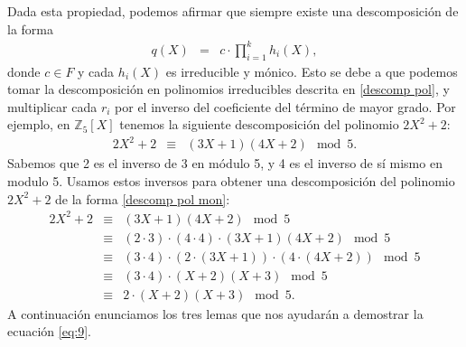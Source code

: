 \documentclass[10pt]{article}
\newcommand{\0}{\mathbf{0}}
\newcommand{\1}{\mathbf{1}}
\newcommand{\modl}{\mod}
\newcommand{\+}{\oplus}
\newcommand{\comentarioin}[1]{}
\theoremstyle{remark}
\theoremstyle{remark}
\begin{document}
Dada esta propiedad,
podemos afirmar que siempre existe una descomposición de la
forma
\begin{eqnarray}
  q(X) & = & c\cdot \prod\limits_{i=1}^k h_i(X), \label{descomp pol mon}
\end{eqnarray}
donde $c\in F$ y cada $h_i(X)$ es irreducible y mónico. Esto se debe a
que podemos tomar la descomposición en polinomios irreducibles
descrita en \eqref{descomp pol}, y multiplicar cada $r_i$ por el
inverso del coeficiente del término de mayor grado. Por ejemplo, en
$\mathbb{Z}_{5}[X]$ tenemos la siguiente descomposición del polinomio
$2X^2 + 2$:
\begin{eqnarray*}
2X^2 + 2 & \equiv & (3X+1)(4X+2) \modl 5.
\end{eqnarray*}
Sabemos que 2 es el inverso de 3 en módulo 5, y 4 es el inverso de sí
mismo en modulo 5. Usamos estos inversos para obtener una
descomposición del polinomio $2X^2 + 2$ de la forma \eqref{descomp pol
  mon}:
\begin{eqnarray*}
  2X^2 + 2 & \equiv & (3X+1)(4X+2) \modl 5\\
  & \equiv & (2\cdot 3) \cdot (4 \cdot 4) \cdot (3X+1)(4X+2) \modl 5\\
  & \equiv & (3 \cdot 4) \cdot (2 \cdot (3X+1))\cdot(4 \cdot (4X+2)) \modl 5\\
  & \equiv & (3 \cdot 4) \cdot (X+2)(X+3) \modl 5\\
    & \equiv & 2\cdot (X+2)(X+3) \modl 5.
\end{eqnarray*}
A continuación enunciamos los tres lemas que nos ayudarán a demostrar
la ecuación \eqref{eq:9}.
     
\end{document}
